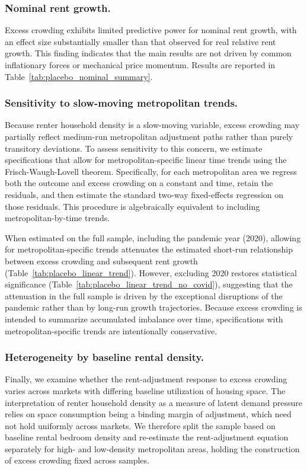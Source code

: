 \documentclass[pdflatex,sn-basic]{sn-jnl}%
\theoremstyle{thmstyleone}%
\theoremstyle{thmstyletwo}%
\theoremstyle{thmstylethree}%
\begin{document}
\subsubsection{Nominal rent growth.}
Excess crowding exhibits limited predictive power for nominal rent growth, with an effect
size substantially smaller than that observed for real relative rent growth. This finding
indicates that the main results are not driven by common inflationary forces or mechanical
price momentum. Results are reported in Table~\ref{tab:placebo_nominal_summary}.

\subsubsection{Sensitivity to slow-moving metropolitan trends.}
Because renter household density is a slow-moving variable, excess crowding may partially
reflect medium-run metropolitan adjustment paths rather than purely transitory deviations.
To assess sensitivity to this concern, we estimate specifications that allow for
metropolitan-specific linear time trends using the Frisch-Waugh-Lovell theorem.
Specifically, for each metropolitan area we regress both the outcome and excess crowding
on a constant and time, retain the residuals, and then estimate the standard two-way
fixed-effects regression on those residuals. This procedure is algebraically equivalent
to including metropolitan-by-time trends.

When estimated on the full sample, including the pandemic year (2020), allowing for
metropolitan-specific trends attenuates the estimated short-run relationship between
excess crowding and subsequent rent growth (Table~\ref{tab:placebo_linear_trend}). However,
excluding 2020 restores statistical significance (Table~\ref{tab:placebo_linear_trend_no_covid}),
suggesting that the attenuation in the full sample is driven by the exceptional
disruptions of the pandemic rather than by long-run growth trajectories. Because excess
crowding is intended to summarize accumulated imbalance over time, specifications with
metropolitan-specific trends are intentionally conservative.

\subsubsection{Heterogeneity by baseline rental density.}
Finally, we examine whether the rent-adjustment response to excess crowding varies across
markets with differing baseline utilization of housing space. The interpretation of
renter household density as a measure of latent demand pressure relies on space
consumption being a binding margin of adjustment, which need not hold uniformly across
markets. We therefore split the sample based on baseline rental bedroom density and
re-estimate the rent-adjustment equation separately for high- and low-density
metropolitan areas, holding the construction of excess crowding fixed across samples.
\end{document}
